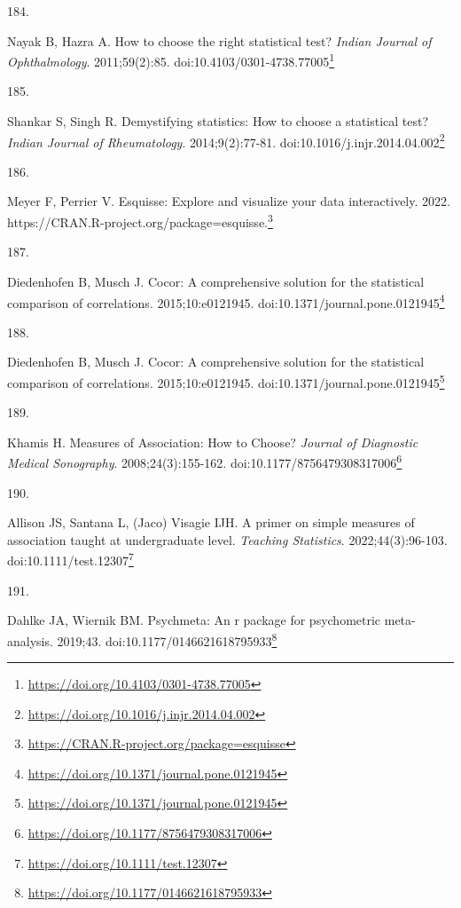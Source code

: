 \documentclass[
  a4paper,
]{book}
\newlength{\cslhangindent}
\newlength{\csllabelwidth}
\newlength{\cslentryspacingunit} %
\newenvironment{CSLReferences}[2] %
 {%
  \setlength{\parindent}{0pt}
  \ifodd #1
  \let\oldpar\par
  \def\par{\hangindent=\cslhangindent\oldpar}
  \fi
  \setlength{\parskip}{#2\cslentryspacingunit}
 }%
 {}
\newcommand{\CSLLeftMargin}[1]{\parbox[t]{\csllabelwidth}{#1}}
\newcommand{\CSLRightInline}[1]{\parbox[t]{\linewidth - \csllabelwidth}{#1}\break}
\renewcommand{\href}[2]{#2\footnote{\url{#1}}}
\begin{document}
\begin{CSLReferences}{0}{0}
\leavevmode{}%
\CSLLeftMargin{184. }%
\CSLRightInline{Nayak B, Hazra A. How to choose the right statistical test? \emph{Indian Journal of Ophthalmology}. 2011;59(2):85. doi:\href{https://doi.org/10.4103/0301-4738.77005}{10.4103/0301-4738.77005}}

\leavevmode{}%
\CSLLeftMargin{185. }%
\CSLRightInline{Shankar S, Singh R. Demystifying statistics: How to choose a statistical test? \emph{Indian Journal of Rheumatology}. 2014;9(2):77-81. doi:\href{https://doi.org/10.1016/j.injr.2014.04.002}{10.1016/j.injr.2014.04.002}}

\leavevmode{}%
\CSLLeftMargin{186. }%
\CSLRightInline{Meyer F, Perrier V. Esquisse: Explore and visualize your data interactively. 2022. \href{https://CRAN.R-project.org/package=esquisse}{https://CRAN.R-project.org/package=esquisse.}}

\leavevmode{}%
\CSLLeftMargin{187. }%
\CSLRightInline{Diedenhofen B, Musch J. Cocor: A comprehensive solution for the statistical comparison of correlations. 2015;10:e0121945. doi:\href{https://doi.org/10.1371/journal.pone.0121945}{10.1371/journal.pone.0121945}}

\leavevmode{}%
\CSLLeftMargin{188. }%
\CSLRightInline{Diedenhofen B, Musch J. Cocor: A comprehensive solution for the statistical comparison of correlations. 2015;10:e0121945. doi:\href{https://doi.org/10.1371/journal.pone.0121945}{10.1371/journal.pone.0121945}}

\leavevmode{}%
\CSLLeftMargin{189. }%
\CSLRightInline{Khamis H. Measures of Association: How to Choose? \emph{Journal of Diagnostic Medical Sonography}. 2008;24(3):155-162. doi:\href{https://doi.org/10.1177/8756479308317006}{10.1177/8756479308317006}}

\leavevmode{}%
\CSLLeftMargin{190. }%
\CSLRightInline{Allison JS, Santana L, (Jaco) Visagie IJH. A primer on simple measures of association taught at undergraduate level. \emph{Teaching Statistics}. 2022;44(3):96-103. doi:\href{https://doi.org/10.1111/test.12307}{10.1111/test.12307}}

\leavevmode{}%
\CSLLeftMargin{191. }%
\CSLRightInline{Dahlke JA, Wiernik BM. {\textbraceleft}Psychmeta{\textbraceright}: An r package for psychometric meta-analysis. 2019;43. doi:\href{https://doi.org/10.1177/0146621618795933}{10.1177/0146621618795933}}


\end{CSLReferences}
\end{document}
